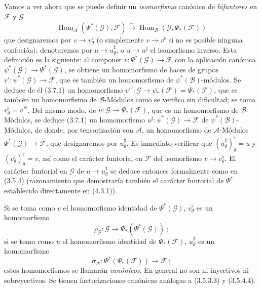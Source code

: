 \begin{env}[4.4.3]
\label{0.4.4.3-fr}
Vamos a ver ahora que se puede definir un \emph{isomorfismo}
canónico de \emph{bifuntores} en $\mathcal{F}$ y $\mathcal{G}$
\[
  \operatorname{Hom}_{\mathcal{A}}(\Psi^*(\mathcal{G}),\mathcal{F})
  \xrightarrow{\sim}
  \operatorname{Hom}_{\mathcal{B}}(\mathcal{G},\Psi_*(\mathcal{F}))
  \tag{4.4.3.1}\label{0.4.4.3.1-fr}
\]
que designaremos por $v\to v_\theta^\flat$ (o simplemente
$v\to v^\flat$ si no es posible ninguna confusión); denotaremos por
$u\to u_\theta^\sharp$, o $u\to u^\sharp$ el isomorfismo inverso.
Esta definición es la siguiente: al componer
$v:\Psi^*(\mathcal{G})\to\mathcal{F}$ con la aplicación canónica
$\psi^*(\mathcal{G})\to\Psi^*(\mathcal{G})$, se obtiene un homomorfismo de
haces de grupos $v':\psi^*(\mathcal{G})\to\mathcal{F}$, que es también un
homomorfismo de $\psi^*(\mathcal{B})$-módulos. Se deduce de él (3.7.1) un
homomorfismo
${v'}^\flat:\mathcal{G}\to\psi_*(\mathcal{F})=\Psi_*(\mathcal{F})$, que es
también un homomorfismo de $\mathcal{B}$-Módulos como se
verifica sin dificultad; se toma $v_\theta^\flat={v'}^\flat$. Del mismo modo, de
$u:\mathcal{G}\to\Psi_*(\mathcal{F})$, que es un homomorfismo de
$\mathcal{B}$-Módulos, se deduce (3.7.1) un homomorfismo
$u^\sharp:\psi^*(\mathcal{G})\to\mathcal{F}$ de
$\psi^*(\mathcal{B})$-Módulos, de donde, por tensorización con $\mathcal{A}$, un
homomorfismo de $\mathcal{A}$-Módulos
$\Psi^*(\mathcal{G})\to\mathcal{F}$, que designaremos por
$u_\theta^\sharp$. Es inmediato verificar que
$(u_\theta^\sharp)_\theta^\flat=u$ y
$(v_\theta^\flat)_\theta^\sharp=v$, así como el carácter funtorial en
$\mathcal{F}$ del isomorfismo $v\to v_\theta^\flat$. El carácter
funtorial en $\mathcal{G}$ de $u\to u_\theta^\sharp$ se deduce entonces
formalmente como en (3.5.4) (razonamiento que demostraría también el
carácter funtorial de $\Psi^*$ establecido directamente en (4.3.1)).

Si se toma como $v$ el homomorfismo identidad de $\Psi^*(\mathcal{G})$,
$v_\theta^\flat$ es un homomorfismo
\[
  \rho_{\mathcal{G}}:\mathcal{G}\longrightarrow
  \Psi_*(\Psi^*(\mathcal{G}))~;
  \tag{4.4.3.2}\label{0.4.4.3.2-fr}
\]
si se toma como $u$ el homomorfismo identidad de $\Psi_*(\mathcal{F})$,
$u_\theta^\sharp$ es un homomorfismo
\[
  \sigma_{\mathcal{F}}:\Psi^*(\Psi_*(\mathcal{F}))
  \longrightarrow\mathcal{F}~;
  \tag{4.4.3.3}\label{0.4.4.3.3-fr}
\]
estos homomorfismos se llamarán \emph{canónicos}. En general no son ni
inyectivos ni sobreyectivos. Se tienen factorizaciones canónicas análogas a
(3.5.3.3) y (3.5.4.4).


\end{env}
